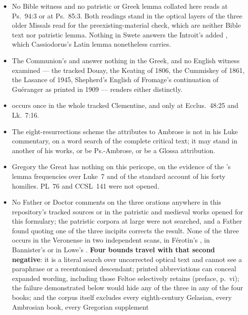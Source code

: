\begin{itemize}
\item No Bible witness and no patristic or Greek lemma collated here reads
 at Ps.\ 94:3 or  at Ps.\ 85:3.
Both readings stand in the optical layers of the three older Missals read for
the preexisting-material check, which are neither Bible text nor patristic
lemma. Nothing in Swete answers the Introit's added , which Cassiodorus's
Latin lemma nonetheless carries.
\item The Communion's  and  answer nothing in the
Greek, and no English witness examined --- the tracked Douay, the Keating of 1806,
the Cummiskey of 1861, the Lasance of 1945, Shepherd's English of Fromage's
continuation of Guéranger as printed in 1909 --- renders
either distinctly.
\item {} occurs once in the whole tracked Clementine, and  only at Ecclus.\ 48:25 and Lk.\ 7:16.
\item The eight-resurrections scheme the  attributes to
Ambrose is not in his Luke commentary, on a word search of the complete critical
text; it may stand in another of his works, or be Ps.-Ambrose, or be a Glossa
attribution.
\item Gregory the Great has nothing on this pericope, on the evidence of the
's lemma frequencies over Luke~7 and of the standard account of his
forty homilies. PL~76 and CCSL~141 were not opened.
\item No Father or Doctor comments on the three orations anywhere in this
repository's tracked sources or in the patristic and medieval works opened for
this formulary; the patristic corpora at large were not searched, and a Father
found quoting one of the three incipits corrects the result. None of the three
occurs in the Veronense in two independent scans, in Férotin's , in Bannister's  or in Lowe's
. \textbf{Four bounds travel with that second negative}: it is
a literal search over uncorrected optical text and cannot see a paraphrase or a
recentonised descendant; printed abbreviations can conceal expanded wording, including those Feltoe
selectively retains (preface, p.~vi); the  failure demonstrated below would
hide any of the three in any of the four books; and the corpus itself excludes
every eighth-century Gelasian, every Ambrosian book, every Gregorian supplement

\end{itemize}
